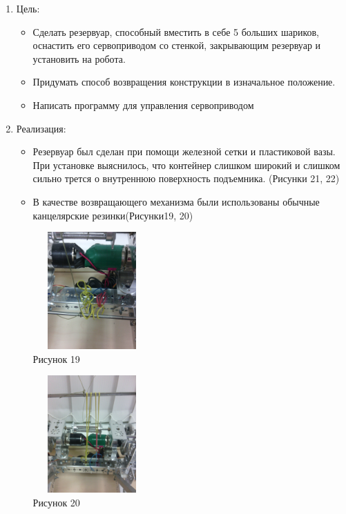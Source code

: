 \begin{enumerate}
	\item Цель:
		\begin{itemize}
			\item Сделать резервуар, способный вместить в себе 5 больших шариков, оснастить его сервоприводом со стенкой, закрывающим резервуар и установить на робота.
			\item Придумать способ возвращения конструкции в изначальное положение.
			\item Написать программу для управления сервоприводом 
		\end{itemize}
	\item Реализация:
		\begin{itemize}
			\item Резервуар был сделан при помощи железной сетки и пластиковой вазы. При установке выяснилось, что контейнер слишком широкий и слишком сильно трется о внутреннюю поверхность подъемника. (Рисунки 21, 22)
			\item В качестве возвращающего механизма были использованы обычные канцелярские резинки(Рисунки19, 20)\\
			\begin{minipage}{0.3\linewidth}
			\includegraphics[width=45mm,height=45mm]{Days/15.11.14/12_1_robot}\\ Рисунок 19
			\end{minipage}
			\begin{minipage}{0.3\linewidth}
			\includegraphics[width=45mm,height=45mm]{Days/15.11.14/12_2_robot}\\ Рисунок 20
			\end{minipage}\\

\end{itemize}
\end{enumerate}
